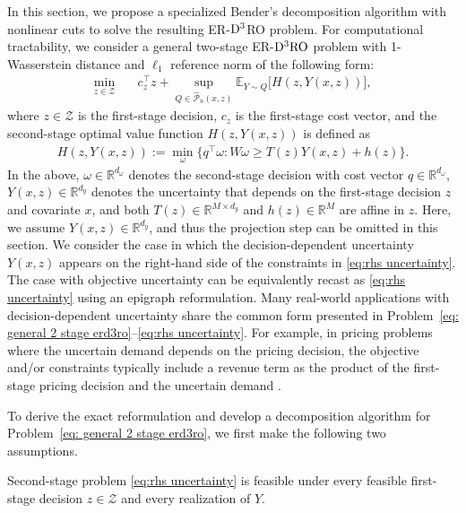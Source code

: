 \documentclass[onefignum,onetabnum]{siamart251216}
\newcounter{example}
\begin{document}
In this section, we propose a specialized Bender's decomposition algorithm with nonlinear cuts to solve the resulting ER-${\rm D^3}$RO problem. For computational tractability, we consider a general two-stage ER-$\rm{D^3RO}$ problem with 1-Wasserstein distance and $\ell_1$ reference norm of the following form:
\begin{align}\label{eq: general 2 stage erd3ro}
    \min_{z\in\mathcal{Z}} \quad & c_z^\top z + \sup_{Q \in \hat{\mathcal{P}}_n(x,z)}\mathbb{E}_{Y \sim Q}\bigl[H(z,Y(x,z))\bigr],
\end{align}
where $z\in\mathcal{Z}$ is the first-stage decision, $c_z$ is the first-stage cost vector, and the second-stage optimal value function $H(z,Y(x,z))$ is defined as
\begin{align}\label{eq:rhs uncertainty}
H(z,Y(x,z)):= \min_{\omega} \{q ^\top \omega:   W \omega\ge T(z)Y(x,z) + h(z)\}.
\end{align}
In the above, $\omega \in \mathbb{R}^{d_{\omega}}$ denotes the second-stage decision with cost vector $q\in \mathbb{R}^{d_{\omega}}$, $Y(x,z) \in \mathbb{R}^{d_y}$ denotes the uncertainty that depends on the first-stage decision $z$ and covariate $x$, and both $T(z) \in \mathbb{R}^{M\times d_y}$ and $h(z) \in \mathbb{R}^{M}$ are affine in $z$. Here, we assume $Y(x,z) \in \mathbb{R}^{d_y}$, and thus the projection step can be omitted in this section. We consider the case in which the decision-dependent uncertainty $Y(x,z)$ appears on the right-hand side of the constraints in \eqref{eq:rhs uncertainty}. The case with objective uncertainty can be equivalently recast as \eqref{eq:rhs uncertainty} using an epigraph reformulation. Many real-world applications with decision-dependent uncertainty share the common form presented in Problem~\eqref{eq: general 2 stage erd3ro}--\eqref{eq:rhs uncertainty}. For example, in pricing problems where the uncertain demand depends on the pricing decision, the objective and/or constraints typically include a revenue term as the product of the first-stage pricing decision and the uncertain demand \citep{liu2022coupled,bertsimas2020predictive}. 

To derive the exact reformulation and develop a decomposition algorithm for Problem~\eqref{eq: general 2 stage erd3ro}, we first make the following two assumptions.
\begin{assumption}
\label{ass:recourse}
    Second-stage problem \eqref{eq:rhs uncertainty} is feasible under every feasible first-stage decision $z \in \mathcal{Z}$ and every realization of $Y$.
\end{assumption}
\end{document}
